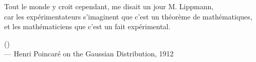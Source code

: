 \begin{flushright}
\itshape
\begin{hangleftquote}{\QFROpen}{\QFRClose}
Tout le monde y croit cependant, me disait un jour M. Lippmann,\\
car les expérimentateurs s'imaginent que c'est un théorème de mathématiques,\\
et les mathématiciens que c'est un fait expérimental.
\end{hangleftquote}
\par\smallskip
\normalfont () \\
— Henri Poincaré on the Gaussian Distribution, 1912
\end{flushright}

